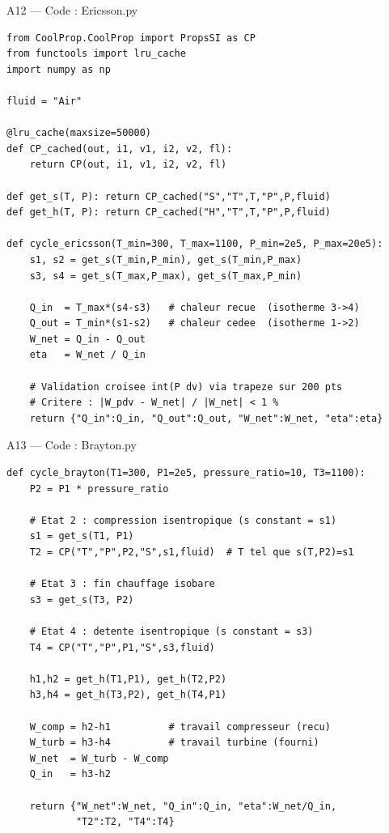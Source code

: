 \documentclass[aspectratio=43, 10pt]{beamer}
\begin{document}
\begin{frame}[fragile]{A12 --- Code : Ericsson.py}

  \begin{exampleblock}{}
  \begin{lstlisting}
from CoolProp.CoolProp import PropsSI as CP
from functools import lru_cache
import numpy as np

fluid = "Air"

@lru_cache(maxsize=50000)
def CP_cached(out, i1, v1, i2, v2, fl):
    return CP(out, i1, v1, i2, v2, fl)

def get_s(T, P): return CP_cached("S","T",T,"P",P,fluid)
def get_h(T, P): return CP_cached("H","T",T,"P",P,fluid)

def cycle_ericsson(T_min=300, T_max=1100, P_min=2e5, P_max=20e5):
    s1, s2 = get_s(T_min,P_min), get_s(T_min,P_max)
    s3, s4 = get_s(T_max,P_max), get_s(T_max,P_min)

    Q_in  = T_max*(s4-s3)   # chaleur recue  (isotherme 3->4)
    Q_out = T_min*(s1-s2)   # chaleur cedee  (isotherme 1->2)
    W_net = Q_in - Q_out
    eta   = W_net / Q_in

    # Validation croisee int(P dv) via trapeze sur 200 pts
    # Critere : |W_pdv - W_net| / |W_net| < 1 %
    return {"Q_in":Q_in, "Q_out":Q_out, "W_net":W_net, "eta":eta}
  \end{lstlisting}
  \end{exampleblock}

\end{frame}

\begin{frame}[fragile]{A13 --- Code : Brayton.py}

  \begin{exampleblock}{}
  \begin{lstlisting}
def cycle_brayton(T1=300, P1=2e5, pressure_ratio=10, T3=1100):
    P2 = P1 * pressure_ratio

    # Etat 2 : compression isentropique (s constant = s1)
    s1 = get_s(T1, P1)
    T2 = CP("T","P",P2,"S",s1,fluid)  # T tel que s(T,P2)=s1

    # Etat 3 : fin chauffage isobare
    s3 = get_s(T3, P2)

    # Etat 4 : detente isentropique (s constant = s3)
    T4 = CP("T","P",P1,"S",s3,fluid)

    h1,h2 = get_h(T1,P1), get_h(T2,P2)
    h3,h4 = get_h(T3,P2), get_h(T4,P1)

    W_comp = h2-h1          # travail compresseur (recu)
    W_turb = h3-h4          # travail turbine (fourni)
    W_net  = W_turb - W_comp
    Q_in   = h3-h2

    return {"W_net":W_net, "Q_in":Q_in, "eta":W_net/Q_in,
            "T2":T2, "T4":T4}
  \end{lstlisting}
  \end{exampleblock}

\end{frame}
\end{document}
